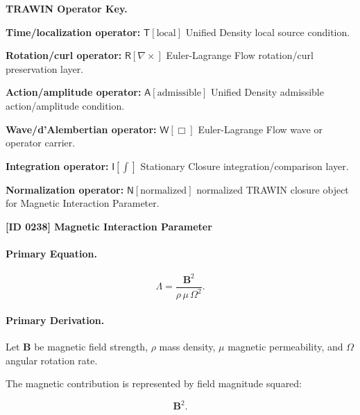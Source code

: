 \par\vspace{0.45\baselineskip}
\noindent\begin{minipage}[t]{\linewidth}
\begingroup
\small
\raggedright
\textbf{TRAWIN Operator Key.}\par
\noindent\textbf{Time/localization operator:} $\mathsf{T}\!\left[\mathrm{local}\right]$ Unified Density local source condition.\par
\noindent\textbf{Rotation/curl operator:} $\mathsf{R}\!\left[\nabla\times\right]$ Euler-Lagrange Flow rotation/curl preservation layer.\par
\noindent\textbf{Action/amplitude operator:} $\mathsf{A}\!\left[\mathrm{admissible}\right]$ Unified Density admissible action/amplitude condition.\par
\noindent\textbf{Wave/d'Alembertian operator:} $\mathsf{W}\!\left[\Box\right]$ Euler-Lagrange Flow wave or operator carrier.\par
\noindent\textbf{Integration operator:} $\mathsf{I}\!\left[\int\right]$ Stationary Closure integration/comparison layer.\par
\noindent\textbf{Normalization operator:} $\mathsf{N}\!\left[\mathrm{normalized}\right]$ normalized TRAWIN closure object for Magnetic Interaction Parameter.\par
\endgroup
\end{minipage}

\clearpage
\noindent\textbf{[ID 0238] Magnetic Interaction Parameter}\par
\vspace{0.35em}
\paragraph{Primary Equation.}
\begin{equation}
\Lambda
=
\frac{\mathbf{B}^2}
{\rho\,\mu\,\Omega^2}.
\end{equation}

\paragraph{Primary Derivation.}
Let $\mathbf{B}$ be magnetic field strength, $\rho$ mass density, $\mu$ magnetic permeability, and $\Omega$ angular rotation rate.

The magnetic contribution is represented by field magnitude squared:

\begin{equation}
\mathbf{B}^2 .
\end{equation}

